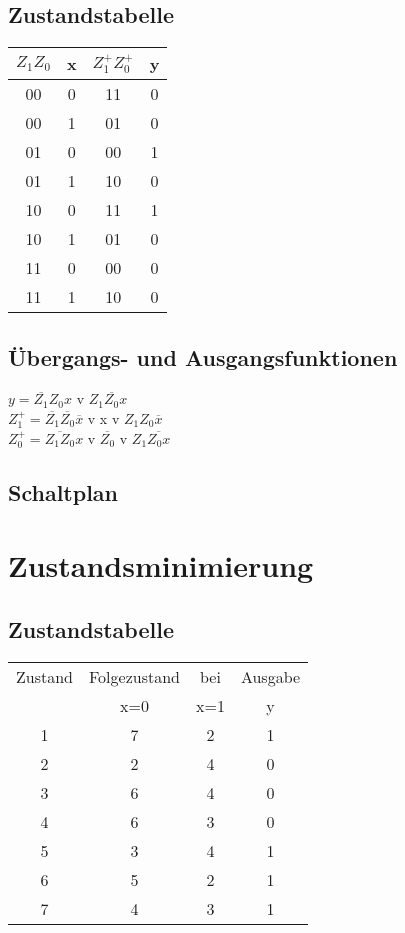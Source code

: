 \documentclass[ngerman,12pt,parskip=half]{scrartcl}
\begin{document}
\subsection{Zustandstabelle}

\begin{tabular}{cccc}  
	$Z_{1}Z_{0}$& x & $Z^+_{1}Z^+_{0}$ & y \\ \hline	
	00 & 0 & 11 & 0  \\ 
	00 & 1 & 01 & 0 \\ \hline
	01 & 0 & 00 & 1 \\
	01 & 1 & 10 & 0 \\ \hline
	10 & 0 & 11 & 1 \\
	10 & 1 & 01 & 0 \\ \hline
	11 & 0 & 00 & 0 \\
	11 & 1 & 10 & 0 \\
\end{tabular}
\vspace{0,5 cm}

\subsection{Übergangs- und Ausgangsfunktionen}

$y=\overline{Z_{1}}Z_{0}x$ v $Z_{1}\overline{Z_{0}}x$ \\
$Z^+_{1}= \overline{Z_{1}}\overline{Z_{0}}\overline{x}$ v x v $Z_{1}Z_0\overline{x}$ \\
$Z^+_{0}=\overline{Z_{1}Z_{0}}x$ v $\overline{Z_{0}}$ v $Z_{1}\overline{Z_{0}x}$

\subsection{Schaltplan}

\begin{center}
	
\end{center}

\clearpage

\section{Zustandsminimierung} 

\subsection{Zustandstabelle}

\begin{tabular}{c|cc|c}  
	Zustand & Folgezustand & bei & Ausgabe \\ 	
	   & x=0 & x=1 & y  \\ \hline
	1 & 7 & 2 & 1 \\ 
	2 & 2 & 4 & 0 \\
	3 & 6 & 4 & 0 \\ 
	4 & 6 & 3 & 0 \\
	5 & 3 & 4 & 1 \\ 
	6 & 5 & 2 & 1 \\
	7 & 4 & 3 & 1 \\
\end{tabular}
\end{document}
